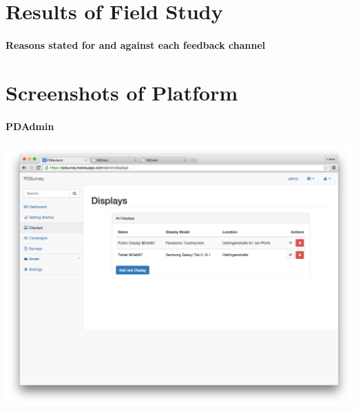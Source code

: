   
  \label{appendix:interview-participant}

  
  \label{appendix:interview-passerby}

  
  \label{appendix:semi-structured-interview}


\cleardoublepage
\section{Results of Field Study}


  \paragraph{Reasons stated for and against each feedback channel}

  



\cleardoublepage
\section{Screenshots of Platform}




\paragraph{PDAdmin}


 \label{screenshot:pdadmin-displays}
    \begin{center}
        \includegraphics[width=\columnwidth]{img/screenshots/pdadmin/displays.png}
    \end{center}


